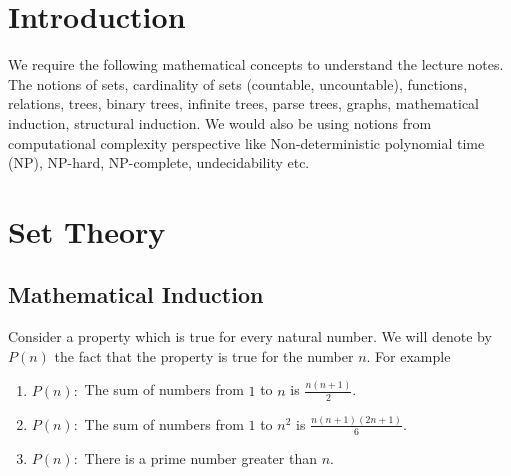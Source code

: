 \chapter{Introduction}
We require the following mathematical concepts to understand the lecture notes. The notions of sets, cardinality of sets (countable, uncountable), functions, relations, trees, binary trees, infinite trees, parse trees, graphs, mathematical induction, structural induction. We would also be using notions from computational complexity perspective like Non-deterministic polynomial time (NP), NP-hard, NP-complete, undecidability etc.


\chapter{Set Theory}
\section{Mathematical Induction}
\label{chap:mathInd}

Consider a property which is true for every natural number. We will denote by $P(n)$ the fact that the property is true for the number $n$. For example
\begin{enumerate}
\item $P(n):$ The sum of numbers from $1$ to $n$ is $\frac{n(n+1)}{2}$. 
\item $P(n):$ The sum of numbers from $1$ to $n^2$ is $\frac{n(n+1)(2n+1)}{6}$.
\item $P(n):$ There is a prime number greater than $n$.
\end{enumerate}

